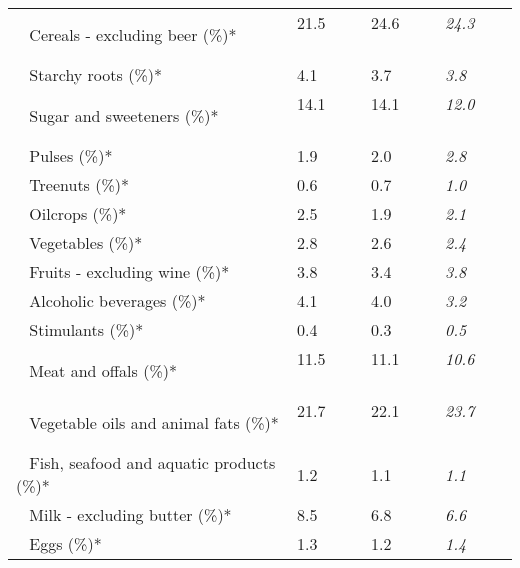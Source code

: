 \begin{tabular}{L{3.9cm} R{1cm} R{1cm} R{1cm}}
	 ~ Cereals - excluding beer (\%)* & 21.5 ~ \ \ & 24.6 ~ \ \ & \textit{24.3} ~ \ \ \\ 
	 ~ Starchy roots (\%)* & 4.1 ~ \ \ & 3.7 ~ \ \ & \textit{3.8} ~ \ \ \\ 
	 ~ Sugar and sweeteners (\%)* & 14.1 ~ \ \ & 14.1 ~ \ \ & \textit{12.0} ~ \ \ \\ 
	 ~ Pulses (\%)* & 1.9 ~ \ \ & 2.0 ~ \ \ & \textit{2.8} ~ \ \ \\ 
	 ~ Treenuts (\%)* & 0.6 ~ \ \ & 0.7 ~ \ \ & \textit{1.0} ~ \ \ \\ 
	 ~ Oilcrops (\%)* & 2.5 ~ \ \ & 1.9 ~ \ \ & \textit{2.1} ~ \ \ \\ 
	 ~ Vegetables (\%)* & 2.8 ~ \ \ & 2.6 ~ \ \ & \textit{2.4} ~ \ \ \\ 
	 ~ Fruits - excluding wine (\%)* & 3.8 ~ \ \ & 3.4 ~ \ \ & \textit{3.8} ~ \ \ \\ 
	 ~ Alcoholic beverages (\%)* & 4.1 ~ \ \ & 4.0 ~ \ \ & \textit{3.2} ~ \ \ \\ 
	 ~ Stimulants (\%)* & 0.4 ~ \ \ & 0.3 ~ \ \ & \textit{0.5} ~ \ \ \\ 
	 ~ Meat and offals (\%)* & 11.5 ~ \ \ & 11.1 ~ \ \ & \textit{10.6} ~ \ \ \\ 
	 ~ Vegetable oils and animal fats (\%)* & 21.7 ~ \ \ & 22.1 ~ \ \ & \textit{23.7} ~ \ \ \\ 
	 ~ Fish, seafood and aquatic products (\%)* & 1.2 ~ \ \ & 1.1 ~ \ \ & \textit{1.1} ~ \ \ \\ 
	 ~ Milk - excluding butter (\%)* & 8.5 ~ \ \ & 6.8 ~ \ \ & \textit{6.6} ~ \ \ \\ 
	 ~ Eggs (\%)* & 1.3 ~ \ \ & 1.2 ~ \ \ & \textit{1.4} ~ \ \ \\ 
       \toprule
      \end{tabular}
      \clearpage
{}
